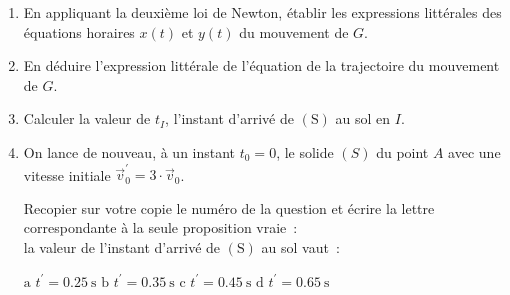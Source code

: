\begin{enumerate}
    \item En appliquant la deuxième loi de Newton, établir les expressions
          littérales des équations horaires $x(t)$ et $y(t)$ du mouvement de
          $G$.
    \item En déduire l'expression littérale de l'équation de la trajectoire du
          mouvement de $G$.
    \item Calculer la valeur de $t_{I}$, l'instant d'arrivé de $\mathrm{(S)}$ au
          sol en $I$.
    \item On lance de nouveau, à un instant $t_{0}=0$, le solide $(S)$ du point
          $A$ avec une vitesse initiale
          $\vec{v}_{0}^{\prime}=3\cdot\vec{v}_{0}$.

          Recopier sur votre copie le numéro de la question et écrire la lettre
          correspondante à la seule proposition vraie~: \\
          la valeur de l'instant d'arrivé de $\mathrm{(S)}$ au sol vaut~: 

          \begin{tcbitemize}[raster columns=8,raster rows=1,
                  raster equal height=rows,
                  raster column skip=-0.8pt,raster force size=false,
                  raster every box/.style={valign=center},
                  label/.style={add to width=-1.4cm,halign=center},
                  answer/.style={add to width=1.4cm}]
              \tcbitem[label] $\mathrm{a}$
              \tcbitem[answer] $t^{\prime}=\qty{0.25}{\s}$
              \tcbitem[label] $\mathrm{b}$
              \tcbitem[answer] $t^{\prime}=\qty{0.35}{\s}$
              \tcbitem[label] $\mathrm{c}$
              \tcbitem[answer] $t^{\prime}=\qty{0.45}{\s}$
              \tcbitem[label] $\mathrm{d}$
              \tcbitem[answer] $t^{\prime}=\qty{0.65}{\s}$ 
          \end{tcbitemize}
\end{enumerate}

